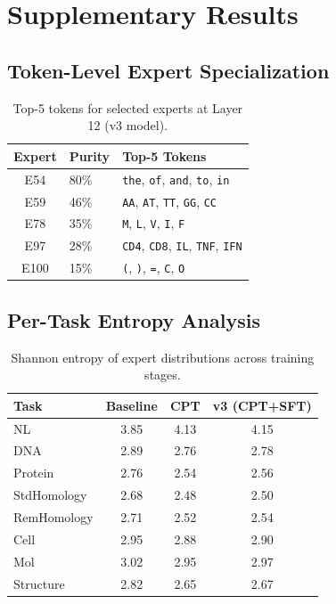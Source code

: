 \documentclass[11pt]{article}
\begin{document}
\newpage
\section{Supplementary Results}

\subsection{Token-Level Expert Specialization}

\begin{table}[H]
\centering
\caption{Top-5 tokens for selected experts at Layer 12 (v3 model).}
\begin{tabular}{clp{8cm}}
\toprule
\textbf{Expert} & \textbf{Purity} & \textbf{Top-5 Tokens} \\
\midrule
E54 & 80\% & \texttt{the}, \texttt{of}, \texttt{and}, \texttt{to}, \texttt{in} \\
E59 & 46\% & \texttt{AA}, \texttt{AT}, \texttt{TT}, \texttt{GG}, \texttt{CC} \\
E78 & 35\% & \texttt{M}, \texttt{L}, \texttt{V}, \texttt{I}, \texttt{F} \\
E97 & 28\% & \texttt{CD4}, \texttt{CD8}, \texttt{IL}, \texttt{TNF}, \texttt{IFN} \\
E100 & 15\% & \texttt{(}, \texttt{)}, \texttt{=}, \texttt{C}, \texttt{O} \\
\bottomrule
\end{tabular}
\end{table}

\subsection{Per-Task Entropy Analysis}

\begin{table}[H]
\centering
\caption{Shannon entropy of expert distributions across training stages.}
\begin{tabular}{lccc}
\toprule
\textbf{Task} & \textbf{Baseline} & \textbf{CPT} & \textbf{v3 (CPT+SFT)} \\
\midrule
NL & 3.85 & 4.13 & 4.15 \\
DNA & 2.89 & 2.76 & 2.78 \\
Protein & 2.76 & 2.54 & 2.56 \\
StdHomology & 2.68 & 2.48 & 2.50 \\
RemHomology & 2.71 & 2.52 & 2.54 \\
Cell & 2.95 & 2.88 & 2.90 \\
Mol & 3.02 & 2.95 & 2.97 \\
Structure & 2.82 & 2.65 & 2.67 \\
\bottomrule
\end{tabular}
\end{table}
\end{document}
